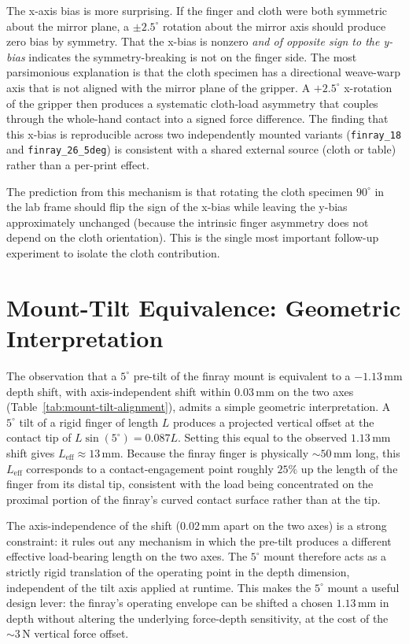 The x-axis bias is more surprising. If the finger and cloth were both
symmetric about the mirror plane, a $\pm 2.5^{\circ}$ rotation about
the mirror axis should produce zero bias by symmetry. That the x-bias
is nonzero \emph{and of opposite sign to the y-bias} indicates the
symmetry-breaking is not on the finger side. The most parsimonious
explanation is that the cloth specimen has a directional weave-warp
axis that is not aligned with the mirror plane of the gripper. A
$+2.5^{\circ}$ x-rotation of the gripper then produces a systematic
cloth-load asymmetry that couples through the whole-hand contact into a
signed force difference. The finding that this x-bias is reproducible
across two independently mounted variants (\texttt{finray\_18} and
\texttt{finray\_26\_5deg}) is consistent with a shared external source
(cloth or table) rather than a per-print effect.

The prediction from this mechanism is that rotating the cloth specimen
$90^{\circ}$ in the lab frame should flip the sign of the x-bias while
leaving the y-bias approximately unchanged (because the intrinsic
finger asymmetry does not depend on the cloth orientation). This is the
single most important follow-up experiment to isolate the cloth
contribution.

\section{Mount-Tilt Equivalence: Geometric Interpretation}
\label{sec:mount-tilt-mechanism}

The observation that a $5^{\circ}$ pre-tilt of the finray mount is
equivalent to a $-1.13$\,mm depth shift, with axis-independent shift
within $0.03$\,mm on the two axes (Table~\ref{tab:mount-tilt-alignment}),
admits a simple geometric interpretation. A $5^{\circ}$ tilt of a rigid
finger of length $L$ produces a projected vertical offset at the
contact tip of $L\sin(5^{\circ}) = 0.087 L$. Setting this equal to the
observed $1.13$\,mm shift gives $L_{\mathrm{eff}} \approx 13$\,mm.
Because the finray finger is physically $\sim 50$\,mm long, this
$L_{\mathrm{eff}}$ corresponds to a contact-engagement point roughly
$25\%$ up the length of the finger from its distal tip, consistent with
the load being concentrated on the proximal portion of the finray's
curved contact surface rather than at the tip.

The axis-independence of the shift (0.02\,mm apart on the two axes) is
a strong constraint: it rules out any mechanism in which the pre-tilt
produces a different effective load-bearing length on the two axes.
The $5^{\circ}$ mount therefore acts as a strictly rigid translation
of the operating point in the depth dimension, independent of the tilt
axis applied at runtime. This makes the $5^{\circ}$ mount a useful
design lever: the finray's operating envelope can be shifted a chosen
$1.13$\,mm in depth without altering the underlying force-depth
sensitivity, at the cost of the $\sim 3$\,N vertical force offset.

